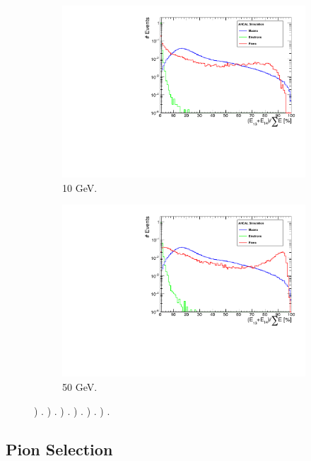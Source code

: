 \begin{figure}[htbp!]
\begin{subfigure}[t]{0.45\textwidth}
		\includegraphics[width=1\linewidth]{chap5/fig_AHCAL_timing/Electrons/SelectionCut_EnergyLastLayers_10GeV}
		\caption{10 GeV.} \label{fig:e10GeV_Elast}
	\end{subfigure}
	\hfill
	\begin{subfigure}[t]{0.45\textwidth}
		\centering
		\includegraphics[width=1\linewidth]{chap5/fig_AHCAL_timing/Electrons/SelectionCut_EnergyLastLayers_50GeV}
		\caption{50 GeV.} \label{fig:e50GeV_Elast}
	\end{subfigure}
	\caption{) . ) . ) . ) . ) . ) .}
\end{figure}

\subsection{Pion Selection}


